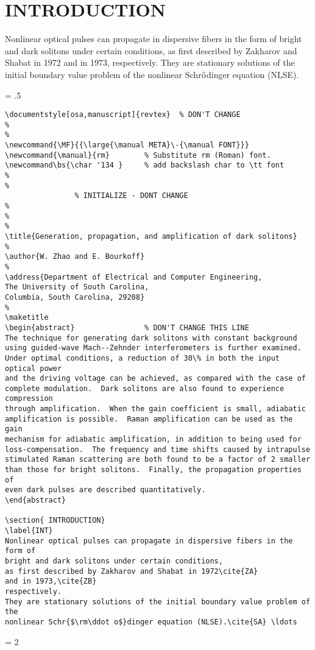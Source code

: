 \section{ INTRODUCTION}
\label{INT}
Nonlinear optical pulses can propagate in dispersive fibers in the form of
bright and dark solitons under certain conditions,
as first described by Zakharov and Shabat in 1972\cite{ZA}
and in 1973,\cite{ZB}
respectively.
They are stationary solutions of the initial boundary value problem of the
nonlinear Schr{$\rm\ddot o$}dinger equation (NLSE).\cite{SA}

\newpage
\baselineskip = .5\baselineskip  %
\begin{verbatim}
\documentstyle[osa,manuscript]{revtex}  % DON'T CHANGE
%
%
\newcommand{\MF}{{\large{\manual META}\-{\manual FONT}}}
\newcommand{\manual}{rm}        % Substitute rm (Roman) font.
\newcommand\bs{\char '134 }     % add backslash char to \tt font
%
%
                % INITIALIZE - DONT CHANGE
%
%
%
\title{Generation, propagation, and amplification of dark solitons}
%
\author{W. Zhao and E. Bourkoff}
%
\address{Department of Electrical and Computer Engineering,
The University of South Carolina,
Columbia, South Carolina, 29208}
%
\maketitle
\begin{abstract}                % DON'T CHANGE THIS LINE
The technique for generating dark solitons with constant background
using guided-wave Mach--Zehnder interferometers is further examined.
Under optimal conditions, a reduction of 30\% in both the input optical power
and the driving voltage can be achieved, as compared with the case of
complete modulation.  Dark solitons are also found to experience compression
through amplification.  When the gain coefficient is small, adiabatic
amplification is possible.  Raman amplification can be used as the gain
mechanism for adiabatic amplification, in addition to being used for
loss-compensation.  The frequency and time shifts caused by intrapulse
stimulated Raman scattering are both found to be a factor of 2 smaller
than those for bright solitons.  Finally, the propagation properties of
even dark pulses are described quantitatively.
\end{abstract}

\section{ INTRODUCTION}
\label{INT}
Nonlinear optical pulses can propagate in dispersive fibers in the form of
bright and dark solitons under certain conditions,
as first described by Zakharov and Shabat in 1972\cite{ZA}
and in 1973,\cite{ZB}
respectively.
They are stationary solutions of the initial boundary value problem of the
nonlinear Schr{$\rm\ddot o$}dinger equation (NLSE).\cite{SA} \ldots

\end{verbatim}
\newpage
\baselineskip = 2\baselineskip  %

